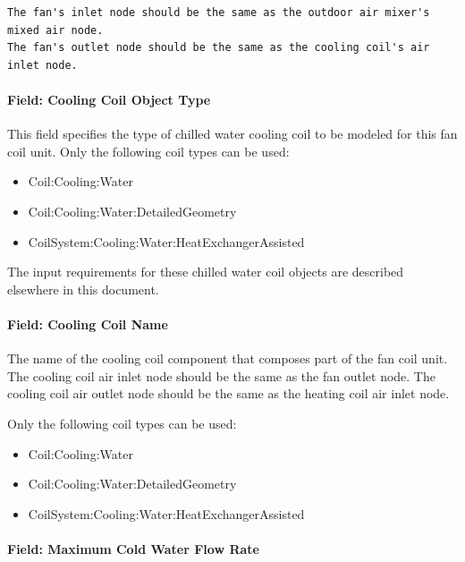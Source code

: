 \begin{lstlisting}
The fan's inlet node should be the same as the outdoor air mixer's mixed air node.
The fan's outlet node should be the same as the cooling coil's air inlet node.
\end{lstlisting}

\paragraph{Field: Cooling Coil Object Type}\label{field-cooling-coil-object-type-003}

This field specifies the type of chilled water cooling coil to be modeled for this fan coil unit. Only the following coil types can be used:

\begin{itemize}
\item
  Coil:Cooling:Water
\item
  Coil:Cooling:Water:DetailedGeometry
\item
  CoilSystem:Cooling:Water:HeatExchangerAssisted
\end{itemize}

The input requirements for these chilled water coil objects are described elsewhere in this document.

\paragraph{Field: Cooling Coil Name}\label{field-cooling-coil-name-003}

The name of the cooling coil component that composes part of the fan coil unit. The cooling coil air inlet node should be the same as the fan outlet node. The cooling coil air outlet node should be the same as the heating coil air inlet node.

Only the following coil types can be used:

\begin{itemize}
\item
  Coil:Cooling:Water
\item
  Coil:Cooling:Water:DetailedGeometry
\item
  CoilSystem:Cooling:Water:HeatExchangerAssisted
\end{itemize}

\paragraph{Field: Maximum Cold Water Flow Rate}\label{field-maximum-cold-water-flow-rate-000}

